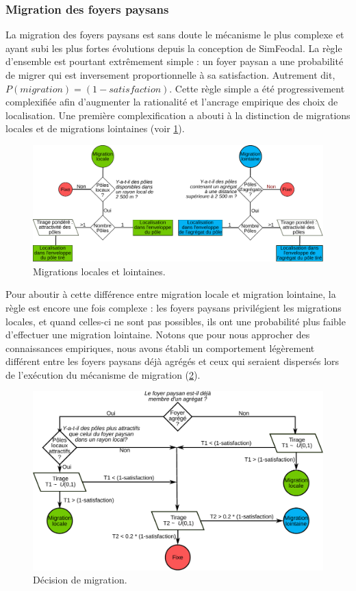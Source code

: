 	\subsubsection{Migration des foyers paysans \label{sssec:migration}}

La migration des foyers paysans est sans doute le mécanisme le plus complexe et ayant subi les plus fortes évolutions depuis la conception de SimFeodal.
La règle d'ensemble est pourtant extrêmement simple : un foyer paysan a une probabilité de migrer qui est inversement proportionnelle à sa satisfaction. 
Autrement dit, $P \left( migration \right) = \left( 1 - satisfaction \right)$.
Cette règle simple a été progressivement complexifiée afin d'augmenter la rationalité et l'ancrage empirique des choix de localisation.
Une première complexification a abouti à la distinction de migrations \og locales\fg{} et de migrations \og lointaines\fg{} (voir \cref{fig:migrations-locales-lointaines}).

\begin{figure}[H]
\centering
\includegraphics[width=1\linewidth]{img/migration_locale-lointaine.pdf}
\caption{Migrations locales et lointaines.}
\label{fig:migrations-locales-lointaines}
\end{figure}
Pour aboutir à cette différence entre migration locale et migration lointaine, la règle est encore une fois complexe : les foyers paysans privilégient les migrations locales, et quand celles-ci ne sont pas possibles, ils ont une probabilité plus faible d'effectuer une migration lointaine.
Notons que pour nous approcher des connaissances empiriques, nous avons établi un comportement légèrement différent entre les foyers paysans déjà agrégés et ceux qui seraient dispersés lors de l'exécution du mécanisme de migration (\cref{fig:choix-migration}).
\begin{figure}[H]
	\centering
	\includegraphics[width=0.9\linewidth]{img/choix_migration.pdf}
	\caption{Décision de migration.}
	\label{fig:choix-migration}
\end{figure}

